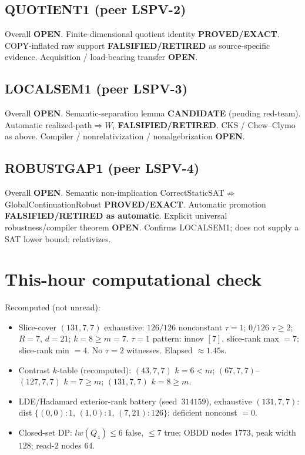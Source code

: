 \documentclass[11pt]{article}
\begin{document}
\subsection*{QUOTIENT1 (peer LSPV-2)}
Overall \textbf{OPEN}. Finite-dimensional quotient identity \textbf{PROVED/EXACT}.
COPY-inflated raw support \textbf{FALSIFIED/RETIRED} as source-specific evidence.
Acquisition / load-bearing transfer \textbf{OPEN}.

\subsection*{LOCALSEM1 (peer LSPV-3)}
Overall \textbf{OPEN}. Semantic-separation lemma \textbf{CANDIDATE} (pending red-team).
Automatic realized-path$\Rightarrow W_i$ \textbf{FALSIFIED/RETIRED}.
CKS / Chew--Clymo as above. Compiler / nonrelativization / nonalgebrization \textbf{OPEN}.

\subsection*{ROBUSTGAP1 (peer LSPV-4)}
Overall \textbf{OPEN}. Semantic non-implication CorrectStaticSAT$\not\Rightarrow$GlobalContinuationRobust
\textbf{PROVED/EXACT}. Automatic promotion \textbf{FALSIFIED/RETIRED as automatic}.
Explicit universal robustness/compiler theorem \textbf{OPEN}. Confirms LOCALSEM1;
does not supply a SAT lower bound; relativizes.

\section*{This-hour computational check}
Recomputed (not unread):
\begin{itemize}
\item Slice-cover $(131,7,7)$ exhaustive: $126/126$ nonconstant $\tau{=}1$;
  $0/126$ $\tau{\ge}2$; $R{=}7$, $d{=}21$; $k{=}8{\ge}m{=}7$.
  $\tau{=}1$ pattern: innov $[7]$, slice-rank max $=7$; slice-rank min $=4$.
  No $\tau{=}2$ witnesses. Elapsed $\approx1.45$s.
\item Contrast $k$-table (recomputed): $(43,7,7)$ $k{=}6{<}m$;
  $(67,7,7)$--$(127,7,7)$ $k{=}7{\ge}m$; $(131,7,7)$ $k{=}8{\ge}m$.
\item LDE/Hadamard exterior-rank battery (seed~$314159$), exhaustive $(131,7,7)$:
  dist $\{(0,0){:}1,\,(1,0){:}1,\,(7,21){:}126\}$; deficient nonconst $=0$.
\item Closed-set DP: $lw(Q_4)\le6$ false, $\le7$ true; OBDD nodes $1773$, peak width $128$;
  read-$2$ nodes $64$.
\end{itemize}
\end{document}
